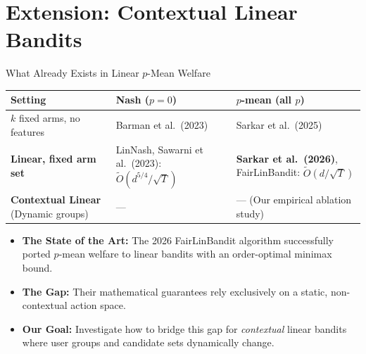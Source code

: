 \documentclass[11pt]{beamer}
\begin{document}
\section{Extension: Contextual Linear Bandits}

\begin{frame}{What Already Exists in Linear $p$-Mean Welfare}
  \small
  \centering
  \begin{tabular}{p{2.8cm}p{3.3cm}p{4.2cm}}
    \toprule
    Setting & Nash ($p=0$) & $p$-mean (all $p$) \\
    \midrule
    $k$ fixed arms, no features
      & Barman et al.\ (2023)
      & Sarkar et al.\ (2025) \\[4pt]
    \textbf{Linear, fixed arm set}
      & LinNash, Sawarni et al.\ 
      (2023): $\tilde O(d^{5/4}/\sqrt T)$
      & \textbf{Sarkar et al.\ (2026)}, FairLinBandit: $\tilde O(d/\sqrt T)$ \\[4pt]
    \textbf{Contextual Linear} \newline (Dynamic groups)
      & --- & --- (Our empirical ablation study) \\
    \bottomrule
  \end{tabular}

  \vspace{4pt}
  \raggedright
  \begin{itemize}
    \item \textbf{The State of the Art:} The 2026 FairLinBandit algorithm successfully ported $p$-mean welfare to linear bandits with an order-optimal minimax bound.
    \item \textbf{The Gap:} Their mathematical guarantees rely exclusively on a static, non-contextual action space. 
    \item \textbf{Our Goal:} Investigate how to bridge this gap for \emph{contextual} linear bandits where user groups and candidate sets dynamically change.
  \end{itemize}
\end{frame}
\end{document}
